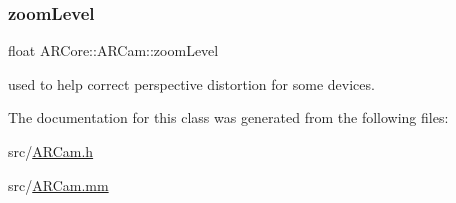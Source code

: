 \subsubsection{\texorpdfstring{zoom\+Level}{zoomLevel}}
{\footnotesize\ttfamily float A\+R\+Core\+::\+A\+R\+Cam\+::zoom\+Level}



used to help correct perspective distortion for some devices. 



The documentation for this class was generated from the following files\+:\begin{DoxyCompactItemize}
\item 
src/\mbox{\hyperlink{_a_r_cam_8h}{A\+R\+Cam.\+h}}\item 
src/\mbox{\hyperlink{_a_r_cam_8mm}{A\+R\+Cam.\+mm}}\end{DoxyCompactItemize}
